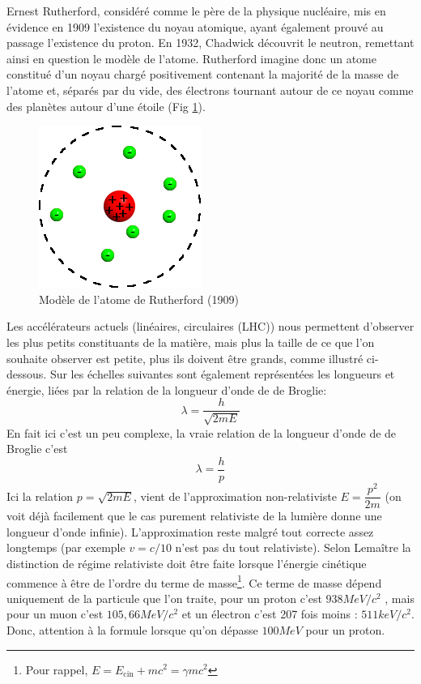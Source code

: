 Ernest Rutherford, considéré comme le père de la physique nucléaire, mis en évidence en 1909 l'existence du noyau atomique, ayant également prouvé au passage l'existence du proton. En 1932, Chadwick découvrit le neutron, remettant ainsi en question le modèle de l'atome. Rutherford imagine donc un atome constitué d'un noyau chargé positivement contenant la majorité de la masse de l'atome et, séparés par du vide, des électrons tournant autour de ce noyau comme des planètes autour d'une étoile (Fig \ref{fig:modele_rutherford}).

\begin{figure}[ht]
    \centering
    \includegraphics[scale=0.65]{Images1/modelerutherford.png}
    \caption{Modèle de l'atome de Rutherford (1909)}
    \label{fig:modele_rutherford}
\end{figure}

Les accélérateurs actuels (linéaires, circulaires (LHC)) nous permettent d'observer les plus petits constituants de la matière, mais plus la taille de ce que l'on souhaite observer est petite, plus ils doivent être grands, comme illustré ci-dessous. Sur les échelles suivantes sont également représentées les longueurs et énergie, liées par la relation de la longueur d'onde de de Broglie:
\[ \lambda=\dfrac{h}{\sqrt{2mE}} \]
En fait ici c'est un peu complexe, la vraie relation de la longueur d'onde de de Broglie c'est 
\[\lambda=\dfrac{h}{p}\]
Ici la relation $p = \sqrt{2mE}$, vient de l'approximation non-relativiste $E = \dfrac{p^{2}}{2m}$ (on voit déjà facilement que le cas purement relativiste de la lumière donne une longueur d'onde infinie). L'approximation reste malgré tout correcte assez longtemps (par exemple $v = c/10$ n'est pas du tout relativiste). Selon Lemaître la distinction de régime relativiste doit être faite lorsque l'énergie cinétique commence à être de l'ordre du terme de masse\footnote{Pour rappel, $E = E_\text{cin} + mc^2 = \gamma mc^2$}. Ce terme de masse dépend uniquement de la particule que l'on traite, pour un proton c'est $938MeV/c^2$ , mais pour un muon c'est $105,66 MeV/c^2$ et un électron c'est 207 fois moins : $511keV/c^2$. Donc, attention à la formule lorsque qu'on dépasse $100 MeV$ pour un proton. 

